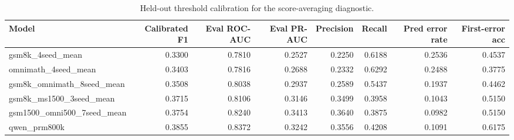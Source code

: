 \begin{table}[t]
\centering
\small
\begin{tabular}{lrrrrrrr}
\toprule
Model & Calibrated F1 & Eval ROC-AUC & Eval PR-AUC & Precision & Recall & Pred error rate & First-error acc \\
\midrule
gsm8k\_4seed\_mean & 0.3300 & 0.7810 & 0.2527 & 0.2250 & 0.6188 & 0.2536 & 0.4537 \\
omnimath\_4seed\_mean & 0.3403 & 0.7816 & 0.2688 & 0.2332 & 0.6292 & 0.2488 & 0.3775 \\
gsm8k\_omnimath\_8seed\_mean & 0.3508 & 0.8038 & 0.2937 & 0.2589 & 0.5437 & 0.1937 & 0.4462 \\
gsm8k\_ms1500\_3seed\_mean & 0.3715 & 0.8106 & 0.3146 & 0.3499 & 0.3958 & 0.1043 & 0.5150 \\
gsm1500\_omni500\_7seed\_mean & 0.3754 & 0.8240 & 0.3413 & 0.3640 & 0.3875 & 0.0982 & 0.5150 \\
qwen\_prm800k & 0.3855 & 0.8372 & 0.3242 & 0.3556 & 0.4208 & 0.1091 & 0.6175 \\
\bottomrule
\end{tabular}
\caption{Held-out threshold calibration for the score-averaging diagnostic.}
\label{tab:phase-b-score-ensemble-calibrated}
\end{table}
